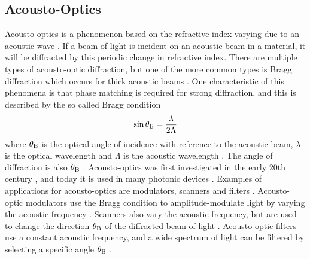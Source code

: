 \documentclass[11pt,twoside]{eitExjobb}
\begin{document}
	\subsection{Acousto-Optics}
	Acousto-optics is a phenomenon based on the refractive index varying due to an acoustic wave \cite{Saleh2007}. If a beam of light is incident on an acoustic beam in a material, it will be diffracted by this periodic change in refractive index. There are multiple types of acousto-optic diffraction, but one of the more common types is Bragg diffraction which occurs for thick acoustic beams \cite{Korpel1988}. One characteristic of this phenomena is that phase matching is required for strong diffraction, and this is described by the so called Bragg condition
	\begin{equation*}
		\sin{\theta_{\mathrm{B}}} = \frac{\lambda}{2\Lambda}
	\end{equation*}
	where $\theta_{\mathrm{B}}$ is the optical angle of incidence with reference to the acoustic beam, $\lambda$ is the optical wavelength and $\Lambda$ is the acoustic wavelength \cite{Saleh2007}. The angle of diffraction is also $\theta_{\mathrm{B}}$ \cite{Saleh2007}. Acousto-optics was first investigated in the early 20th century \cite{Korpel1981}, and today it is used in many photonic devices \cite{Saleh2007}. Examples of applications for acousto-optics are modulators, scanners and filters \cite{Saleh2007}. Acousto-optic modulators use the Bragg condition to amplitude-modulate light by varying the acoustic frequency \cite{Saleh2007}. Scanners also vary the acoustic frequency, but are used to change the direction $\theta_{\mathrm{B}}$ of the diffracted beam of light \cite{Saleh2007}. Acousto-optic filters use a constant acoustic frequency, and a wide spectrum of light can be filtered by selecting a specific angle $\theta_{\mathrm{B}}$ \cite{Saleh2007}.
	
\end{document}
